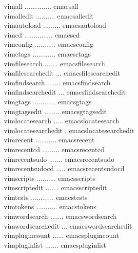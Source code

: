 \documentclass[11pt,a4paper,twoside]{book}
\begin{document}
\begin{codebox}
\color{neongreen}vimall .............. emacsall\\
\color{neongreen}vimalledit .......... emacsalledit\\
\color{neongreen}vimautoload ......... emacsautoload\\
\color{neongreen}vimcd ............... emacscd\\
\color{neongreen}vimconfig ........... emacsconfig\\
\color{neongreen}vimctags ............ emacsctags\\
\color{neongreen}vimfilesearch ....... emacsfilesearch\\
\color{neongreen}vimfilesearchedit ... emacsfilesearchedit\\
\color{neongreen}vimfindsearch ....... emacsfindsearch\\
\color{neongreen}vimfindsearchedit ... emacsfindsearchedit\\
\color{neongreen}vimgtags ............ emacsgtags\\
\color{neongreen}vimgtagsedit ........ emacsgtagsedit\\
\color{neongreen}vimlocatesearch ..... emacslocatesearch\\
\color{neongreen}vimlocatesearchedit . emacslocatesearchedit\\
\color{neongreen}vimrecent ........... emacsrecent\\
\color{neongreen}vimrecentcd ......... emacsrecentcd\\
\color{neongreen}vimrecentsudo ....... emacsrecentsudo\\
\color{neongreen}vimrecentsudocd ..... emacsrecentsudocd\\
\color{neongreen}vimscripts .......... emacsscripts\\
\color{neongreen}vimscriptedit ....... emacsscriptedit\\
\color{neongreen}vimtests ............ emacstests\\
\color{neongreen}vimtokens ........... emacstokens\\
\color{neongreen}vimwordsearch ....... emacswordsearch\\
\color{neongreen}vimwordsearchedit ... emacswordsearchedit\\
\color{neongreen}vimplugincount ...... emacsplugincount\\
\color{neongreen}vimpluginlist ....... emacspluginlist\\
\end{codebox}
\end{document}
